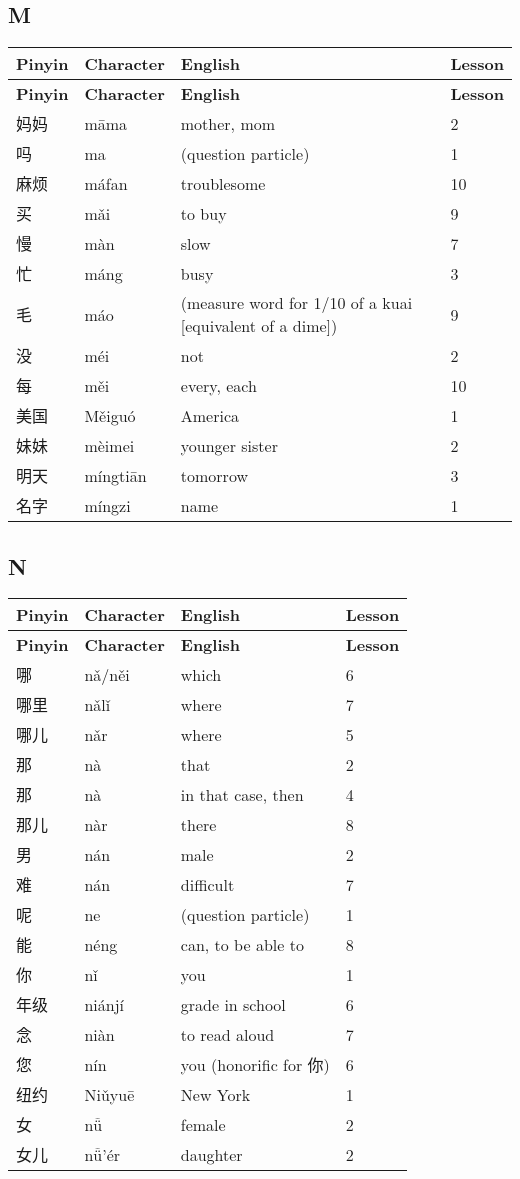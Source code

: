 \documentclass[12pt]{article}
\newcommand{\vocabitem}[4]{%
  #1 & #2 & #3 & #4 \\ \midrule
}
\begin{document}
\subsection*{M}
\begin{longtable}{P{\dimexpr\textwidth/4\relax}P{\dimexpr\textwidth/4\relax}P{\dimexpr\textwidth/4\relax}P{\dimexpr\textwidth/4\relax}}
\toprule
\textbf{Pinyin} & \textbf{Character} & \textbf{English} & \textbf{Lesson} \\
\midrule
\endfirsthead
\toprule
\textbf{Pinyin} & \textbf{Character} & \textbf{English} & \textbf{Lesson} \\
\midrule
\endhead
\vocabitem{妈妈}{māma}{mother, mom}{2}
\vocabitem{吗}{ma}{(question particle)}{1}
\vocabitem{麻烦}{máfan}{troublesome}{10}
\vocabitem{买}{mǎi}{to buy}{9}
\vocabitem{慢}{màn}{slow}{7}
\vocabitem{忙}{máng}{busy}{3}
\vocabitem{毛}{máo}{(measure word for 1/10 of a kuai [equivalent of a dime])}{9}
\vocabitem{没}{méi}{not}{2}
\vocabitem{每}{měi}{every, each}{10}
\vocabitem{美国}{Měiguó}{America}{1}
\vocabitem{妹妹}{mèimei}{younger sister}{2}
\vocabitem{明天}{míngtiān}{tomorrow}{3}
\vocabitem{名字}{míngzi}{name}{1}
\end{longtable}

\subsection*{N}
\begin{longtable}{P{\dimexpr\textwidth/4\relax}P{\dimexpr\textwidth/4\relax}P{\dimexpr\textwidth/4\relax}P{\dimexpr\textwidth/4\relax}}
\toprule
\textbf{Pinyin} & \textbf{Character} & \textbf{English} & \textbf{Lesson} \\
\midrule
\endfirsthead
\toprule
\textbf{Pinyin} & \textbf{Character} & \textbf{English} & \textbf{Lesson} \\
\midrule
\endhead

\vocabitem{哪}{nǎ/něi}{which}{6}
\vocabitem{哪里}{nǎlǐ}{where}{7}
\vocabitem{哪儿}{nǎr}{where}{5}
\vocabitem{那}{nà}{that}{2}
\vocabitem{那}{nà}{in that case, then}{4}
\vocabitem{那儿}{nàr}{there}{8}
\vocabitem{男}{nán}{male}{2}
\vocabitem{难}{nán}{difficult}{7}
\vocabitem{呢}{ne}{(question particle)}{1}
\vocabitem{能}{néng}{can, to be able to}{8}
\vocabitem{你}{nǐ}{you}{1}
\vocabitem{年级}{niánjí}{grade in school}{6}
\vocabitem{念}{niàn}{to read aloud}{7}
\vocabitem{您}{nín}{you (honorific for 你)}{6}
\vocabitem{纽约}{Niǔyuē}{New York}{1}
\vocabitem{女}{nǚ}{female}{2}
\vocabitem{女儿}{nǚ'ér}{daughter}{2}
\end{longtable}
\end{document}
